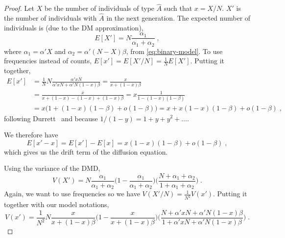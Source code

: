 \documentclass[12pt]{extarticle}
\begin{document}
\begin{appendices}
\begin{proof}
Let $X$ be the number of individuals of type $\hat{A}$ such that $x=X/N$. $X'$ is the number of individuals with $\hat{A}$ in the next generation.
The expected number of individuals is (due to the DM approximation),
\begin{equation}
E[X'] = N  \frac{\alpha_1}{\alpha_1+\alpha_2} \;,
\end{equation}
where $\alpha_1 = \alpha' X$ and $\alpha_2 = \alpha'(N-X)\beta$, from  \cref{eq:binary-model}.
To use frequencies instead of counts, $E[x'] = E[X'/N] = \frac{1}{N}E[X']$.
Putting it together,
\begin{equation}
\begin{split}
E[x'] &= \frac{1}{N}N\frac{\alpha' xN}{\alpha' xN + \alpha' N (1-x)\beta}
	  = \frac{x}{x + (1-x)\beta} \\
	  &= \frac{x}{x + (1-x) -(1-x) + (1-x)\beta}
	  = x \frac{1}{1 -(1-x)(1-\beta)}  \\
	  &= x \big(1 + (1-x)(1-\beta) + o(1-\beta)\big)
	  = x + x(1-x)(1-\beta) + o(1-\beta) \;, 
\end{split}
\end{equation}
following Durrett~\citep[p.~253, ch~7.2]{durret} and because $1/(1-y)=1+y+y^2+\ldots$.

{We} therefore have
\begin{equation}\label{eq:expec_freq}
E[x'-x] = E[x'] - E[x] = x(1-x)(1-\beta) + o(1-\beta) \;,
\end{equation}
which gives us the drift term of the diffusion equation.

Using the variance of the DMD,
\begin{equation}
V(X') = N\frac{\alpha_1}{\alpha_1+\alpha_2}
\Big(1-\frac{\alpha_1}{\alpha_1+\alpha_2}\Big)
\Big(\frac{N + \alpha_1+\alpha_2}{1+\alpha_1+\alpha_2}\Big) \;.
\end{equation}
Again, we want to use frequencies so we have $V(X'/N) = \frac{1}{N^2}V(x')$.
Putting it together with our model notations,
\begin{equation}
V(x') = \frac{1}{N^2}N\frac{x}{x+(1-x)\beta}\Big(1-\frac{x}{x+(1-x)\beta}\Big)
\Big(\frac{N + \alpha' xN + \alpha' N(1-x)\beta}{1 + \alpha' xN + \alpha' N(1-x)\beta}\Big) \;.
\end{equation}


\end{proof}
\end{appendices}
\end{document}
